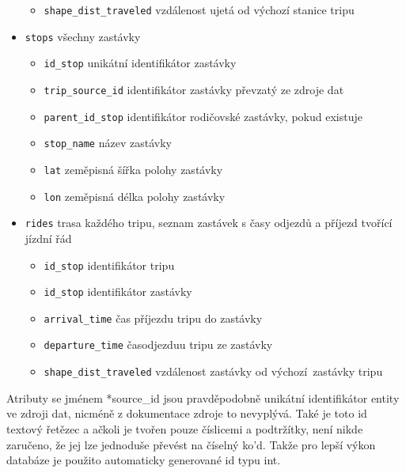 \begin{itemize}
\begin{itemize}
			\item \verb-shape_dist_traveled- vzdálenost ujetá od výchozí stanice tripu

		\end{itemize}

	\item \verb-stops- všechny zastávky

		\begin{itemize}
			\item \verb-id_stop- unikátní identifikátor zastávky

			\item \verb-trip_source_id- identifikátor zastávky převzatý ze zdroje dat

			\item \verb-parent_id_stop- identifikátor rodičovské zastávky, pokud existuje

			\item \verb-stop_name- název zastávky

			\item \verb-lat- zeměpisná šířka polohy zastávky

			\item \verb-lon- zeměpisná délka polohy zastávky

		\end{itemize}

	\item \verb-rides- trasa každého tripu, seznam zastávek s časy odjezdů a příjezd tvořící jízdní řád

	\begin{itemize}
		\item \verb-id_stop- identifikátor tripu

		\item \verb-id_stop- identifikátor zastávky

		\item \verb-arrival_time- čas příjezdu tripu do zastávky

		\item \verb-departure_time- časodjezduu tripu ze zastávky

		\item \verb-shape_dist_traveled- vzdálenost zastávky od výchozí zastávky tripu

	\end{itemize}

\end{itemize}

Atributy se jménem *source\_id jsou pravděpodobně unikátní identifikátor entity ve zdroji dat, nicméně z dokumentace zdroje to nevyplývá. Také je toto id textový řetězec a ačkoli je tvořen pouze číslicemi a podtržítky, není nikde zaručeno, že jej lze jednoduše převést na číselný ko'd. Takže pro lepší výkon databáze je použito automaticky generované id typu \gls{int}.

